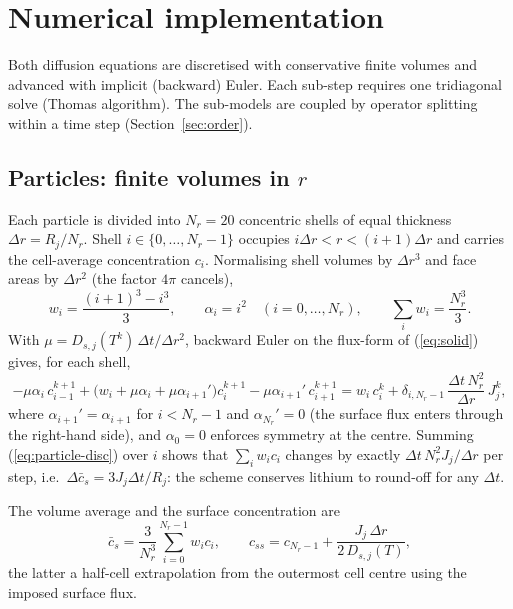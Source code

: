 \documentclass[11pt]{article}
\newcommand{\css}{c_{ss}}
\begin{document}
\section{Numerical implementation}\label{sec:numerics}

Both diffusion equations are discretised with conservative finite volumes and advanced with implicit (backward) Euler. Each sub-step requires one tridiagonal solve (Thomas algorithm). The sub-models are coupled by operator splitting within a time step (Section~\ref{sec:order}).

\subsection{Particles: finite volumes in $r$}\label{sec:particle-num}
Each particle is divided into $N_r=20$ concentric shells of equal thickness $\Delta r=R_j/N_r$. Shell $i\in\{0,\dots,N_r-1\}$ occupies $i\Delta r<r<(i+1)\Delta r$ and carries the cell-average concentration $c_i$. Normalising shell volumes by $\Delta r^{3}$ and face areas by $\Delta r^{2}$ (the factor $4\pi$ cancels),
\begin{equation}
w_i=\frac{(i+1)^{3}-i^{3}}{3},\qquad \alpha_i=i^{2}\quad(i=0,\dots,N_r),\qquad \sum_{i}w_i=\frac{N_r^{3}}{3}.
\end{equation}
With $\mu=D_{s,j}(T^{k})\,\Delta t/\Delta r^{2}$, backward Euler on the flux-form of (\ref{eq:solid}) gives, for each shell,
\begin{equation}
-\mu\alpha_i\,c_{i-1}^{k+1}+\bigl(w_i+\mu\alpha_i+\mu\alpha_{i+1}'\bigr)c_i^{k+1}-\mu\alpha_{i+1}'\,c_{i+1}^{k+1}
= w_i\,c_i^{k}+\delta_{i,N_r-1}\,\frac{\Delta t\,N_r^{2}}{\Delta r}\,J_j^{k},
\label{eq:particle-disc}
\end{equation}
where $\alpha_{i+1}'=\alpha_{i+1}$ for $i<N_r-1$ and $\alpha_{N_r}'=0$ (the surface flux enters through the right-hand side), and $\alpha_0=0$ enforces symmetry at the centre. Summing (\ref{eq:particle-disc}) over $i$ shows that $\sum_i w_ic_i$ changes by exactly $\Delta t\,N_r^{2}J_j/\Delta r$ per step, i.e.\ $\Delta\bar c_s=3J_j\Delta t/R_j$: the scheme conserves lithium to round-off for any $\Delta t$.

The volume average and the surface concentration are
\begin{equation}
\bar c_s=\frac{3}{N_r^{3}}\sum_{i=0}^{N_r-1}w_ic_i,\qquad
\css=c_{N_r-1}+\frac{J_j\,\Delta r}{2\,D_{s,j}(T)}, \label{eq:css}
\end{equation}
the latter a half-cell extrapolation from the outermost cell centre using the imposed surface flux.
\end{document}
